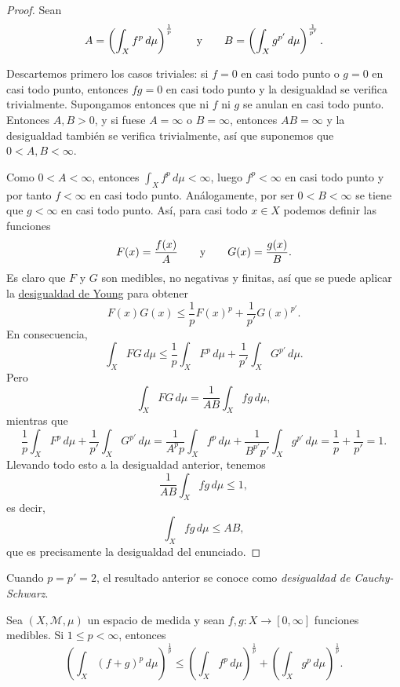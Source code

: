 \documentclass[a4paper, 11pt, oneside]{report}
\begin{document}
\begin{proof}
  Sean
  \[A = \left(\int_X f^p \, d\mu\right)^{\frac{1}{p}} \qquad \textup{y} \qquad B = \left(\int_X g^{p'} \, d\mu\right)^{\frac{1}{p'}}.\]

  Descartemos primero los casos triviales: si $f = 0$ en casi todo punto o $g = 0$ en casi todo punto, entonces $fg = 0$ en casi todo punto y la desigualdad se verifica trivialmente. Supongamos entonces que ni $f$ ni $g$ se anulan en casi todo punto. Entonces $A,B>0$, y si fuese $A = \infty$ o $B = \infty$, entonces $AB=\infty$ y la desigualdad también se verifica trivialmente, así que suponemos que $0 < A,B < \infty$.

  Como $0 < A < \infty$, entonces $\int_X f^p \, d\mu < \infty$, luego $f^p<\infty$ en casi todo punto y por tanto $f < \infty$ en casi todo punto. Análogamente, por ser $0<B<\infty$ se tiene que $g < \infty$ en casi todo punto. Así, para casi todo $x \in X$ podemos definir las funciones
  \[F(x)=\frac{f(x)}{A} \qquad \textup{y} \qquad G(x)=\frac{g(x)}{B}.\]
  Es claro que $F$ y $G$ son medibles, no negativas y finitas, así que se puede aplicar la \hyperref[teo:1.2.5]{\color{c1}desigualdad de Young} para obtener
  \[F(x)G(x) \leq \frac{1}{p}F(x)^p +\frac{1}{p'}G(x)^{p'}.\]
  En consecuencia,
  \[\int_X FG \, d\mu \leq \frac{1}{p} \int_X F^p \, d\mu + \frac{1}{p'}\int_X G^{p'} \, d\mu.\]
  Pero
  \[\int_X FG \, d\mu = \frac{1}{AB}\int_X fg \, d\mu,\]
  mientras que
  \[\frac{1}{p} \int_X F^p \, d\mu + \frac{1}{p'}\int_X G^{p'} \, d\mu = \frac{1}{A^p p} \int_X f^p \, d\mu + \frac{1}{B^{p'}p'}\int_X g^{p'} \, d\mu = \frac{1}{p}+\frac{1}{p'} = 1.\]
  Llevando todo esto a la desigualdad anterior, tenemos
  \[\frac{1}{AB} \int_X fg \, d\mu \leq 1,\]
  es decir,
  \[\int_X fg \, d\mu \leq AB,\]
  que es precisamente la desigualdad del enunciado.
\end{proof}

Cuando $p=p' = 2$, el resultado anterior se conoce como \emph{desigualdad de Cauchy-Schwarz}.

\begin{theorem}\label{teo:1.2.7}
  Sea $(X,\mathcal{M},\mu)$ un espacio de medida y sean $f,g \colon X \to [0,\infty]$ funciones medibles. Si $1 \leq p < \infty$, entonces
  \[\left(\int_X (f+g)^p \, d\mu\right)^{\frac{1}{p}} \leq \left(\int_X f^p \, d\mu\right)^{\frac{1}{p}}+\left(\int_X g^{p} \, d\mu\right)^{\frac{1}{p
  }}.\]
\end{theorem}
\end{document}
